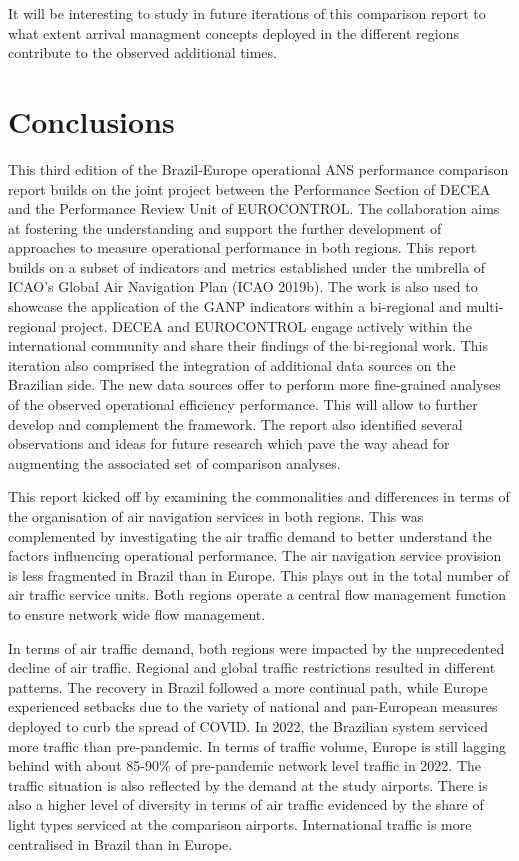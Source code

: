 \documentclass[
  a4paper,
  DIV=11,
  numbers=noendperiod]{scrreport}
\begin{document}
It will be interesting to study in future iterations of this comparison
report to what extent arrival managment concepts deployed in the
different regions contribute to the observed additional times.


\hypertarget{conclusions}{%
\chapter{Conclusions}\label{conclusions}}

This third edition of the Brazil-Europe operational ANS performance
comparison report builds on the joint project between the Performance
Section of DECEA and the Performance Review Unit of EUROCONTROL. The
collaboration aims at fostering the understanding and support the
further development of approaches to measure operational performance in
both regions. This report builds on a subset of indicators and metrics
established under the umbrella of ICAO's Global Air Navigation Plan
(ICAO 2019b). The work is also used to showcase the application of the
GANP indicators within a bi-regional and multi-regional project. DECEA
and EUROCONTROL engage actively within the international community and
share their findings of the bi-regional work. This iteration also
comprised the integration of additional data sources on the Brazilian
side. The new data sources offer to perform more fine-grained analyses
of the observed operational efficiency performance. This will allow to
further develop and complement the framework. The report also identified
several observations and ideas for future research which pave the way
ahead for augmenting the associated set of comparison analyses.

This report kicked off by examining the commonalities and differences in
terms of the organisation of air navigation services in both regions.
This was complemented by investigating the air traffic demand to better
understand the factors influencing operational performance. The air
navigation service provision is less fragmented in Brazil than in
Europe. This plays out in the total number of air traffic service units.
Both regions operate a central flow management function to ensure
network wide flow management.

In terms of air traffic demand, both regions were impacted by the
unprecedented decline of air traffic. Regional and global traffic
restrictions resulted in different patterns. The recovery in Brazil
followed a more continual path, while Europe experienced setbacks due to
the variety of national and pan-European measures deployed to curb the
spread of COVID. In 2022, the Brazilian system serviced more traffic
than pre-pandemic. In terms of traffic volume, Europe is still lagging
behind with about 85-90\% of pre-pandemic network level traffic in 2022.
The traffic situation is also reflected by the demand at the study
airports. There is also a higher level of diversity in terms of air
traffic evidenced by the share of light types serviced at the comparison
airports. International traffic is more centralised in Brazil than in
Europe.
\end{document}
